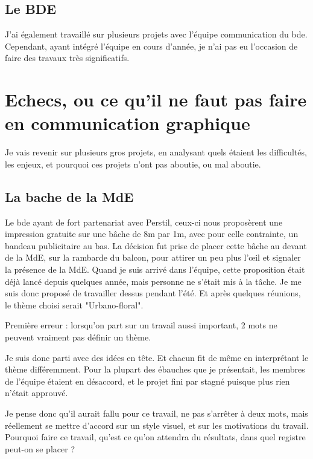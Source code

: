     \subsection{Le BDE}
    
        J'ai également travaillé sur plusieurs projets avec l'équipe communication du bde.
        Cependant, ayant intégré l'équipe en cours d'année, je n'ai pas eu l'occasion de faire des travaux très significatifs.


\section{Echecs, ou ce qu'il ne faut pas faire en communication graphique}

    Je vais revenir sur plusieurs gros projets, en analysant quels étaient les difficultés, les enjeux, et pourquoi ces projets n'ont pas aboutie, ou mal aboutie.
    
    \subsection{La bache de la MdE}
    
        Le bde ayant de fort partenariat avec Perstil, ceux-ci nous proposèrent une impression gratuite sur une bâche de 8m par 1m, avec pour celle contrainte, un bandeau publicitaire au bas.
        La décision fut prise de placer cette bâche au devant de la MdE, sur la rambarde du balcon, pour attirer un peu plus l'œil et signaler la présence de la MdE.
        Quand je suis arrivé dans l'équipe, cette proposition était déjà lancé depuis quelques année, mais personne ne s'était mis à la tâche.
        Je me suis donc proposé de travailler dessus pendant l'été. Et après quelques réunions, le thème choisi serait "Urbano-floral".
        
        Première erreur : lorsqu'on part sur un travail aussi important, 2 mots ne peuvent vraiment pas définir un thème.
        
        Je suis donc parti avec des idées en tête. Et chacun fit de même en interprétant le thème différemment.
        Pour la plupart des ébauches que je présentait, les membres de l'équipe étaient en désaccord, et le projet fini par stagné puisque plus rien n'était approuvé.
        
        Je pense donc qu'il aurait fallu pour ce travail, ne pas s'arrêter à deux mots, mais réellement se mettre d'accord sur un style visuel, et sur les motivations du travail.
        Pourquoi faire ce travail, qu'est ce qu'on attendra du résultats, dans quel registre peut-on se placer ?
        
